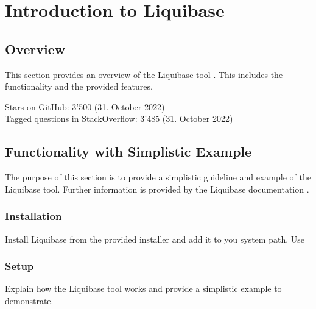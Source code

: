 

\chapter{Introduction to Liquibase}
\section{Overview}
This section provides an overview of the Liquibase tool \cite{LiquibaseDoc}. This includes the functionality and the provided features.

%
%
%
%
Stars on GitHub: 3'500 (31. October 2022)\\
Tagged questions in StackOverflow: 3'485 (31. October 2022)\\

\section{Functionality with Simplistic Example}
The purpose of this section is to provide a simplistic guideline and example of the Liquibase tool. Further information is provided by the Liquibase documentation \cite{LiquibaseDoc}.

\subsection{Installation}
%
Install Liquibase from the provided installer and add it to you system path. 
Use \

\subsection{Setup}
%



Explain how the Liquibase tool works and provide a simplistic example to demonstrate.







\newpage